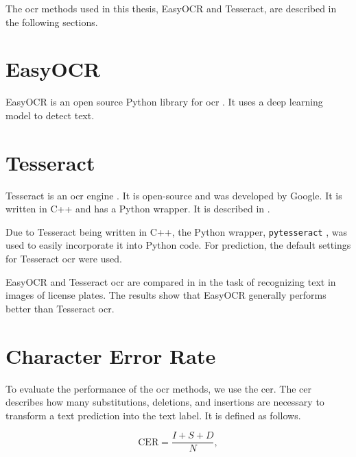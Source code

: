 The \gls{ocr} methods used in this thesis, EasyOCR and Tesseract, are described in the following sections.

\section{EasyOCR}
\label{subsec:easyocr}

EasyOCR is an open source Python library for \gls{ocr} \cite{easyocr_2020}. It uses a deep learning model to detect text.

\section{Tesseract}
\label{subsec:tesseract}

Tesseract is an \gls{ocr} engine \cite{tesseract_2007}. It is open-source and was developed by Google. It is written in C++ and has a Python wrapper.
It is described in \cite{ocr_survey_tess_2013}.

Due to Tesseract being written in C++, the Python wrapper, \texttt{pytesseract} \cite{pytesseract_2022}, was used to easily incorporate it into Python code.
For prediction, the default settings for Tesseract \gls{ocr} were used.

EasyOCR and Tesseract \gls{ocr} are compared in \cite{ocr_tess_vs_easyocr_2022} in the task of recognizing text in images of license plates.
The results show that EasyOCR generally performs better than Tesseract \gls{ocr}.


\section{Character Error Rate}
\label{subsec:cer}

To evaluate the performance of the \gls{ocr} methods, we use the \gls{cer}.
The \gls{cer} \cite{cer_2022} describes how many substitutions, deletions, and insertions are necessary to transform a text prediction into the text label.
It is defined as follows.

\begin{equation}
    \text{CER} = \frac{I + S + D}{N},
    \label{eq:cer}
\end{equation}

